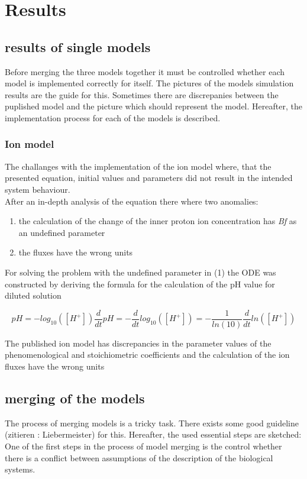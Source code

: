 \section{Results}
\subsection{results of single models}
Before merging the three models together it must be controlled whether each model is implemented correctly for itself. The pictures of the models simulation results are the guide for this. Sometimes there are discrepanies between the puplished model and the picture which should represent the model.  Hereafter, the implementation process for each of the models is described.

\subsubsection{Ion model}
The challanges with the implementation of the ion model where, that the presented equation, initial values and parameters did not result in the intended system behaviour. \\
After an in-depth analysis of the equation there where two anomalies:

\begin{enumerate}
	\item the calculation of the change of the inner proton ion concentration has \emph{Bf} as an undefined parameter
	\item the fluxes have the wrong units
\end{enumerate}
For solving the problem with the undefined parameter in (1) the ODE was constructed by deriving the formula for the calculation of the pH value for diluted solution 

\begin{equation*}
pH = - log_{10}([H^+])
\frac{d}{dt} pH = - \frac{d}{dt} log_{10}([H^+])
= - \frac{1}{ln(10)} \frac{d}{dt}ln([H^+])
\end{equation*}

The published ion model has discrepancies in the parameter values of the phenomenological and stoichiometric coefficients and the calculation of the ion fluxes have the wrong units 




\subsection{merging of the models}
The process of merging models is a tricky task. There exists some good guideline (zitieren : Liebermeister) for this.
Hereafter, the used essential steps are sketched:\\
One of the first steps in the process of model merging is the control whether there is a conflict between assumptions of the description of the biological systems. 

